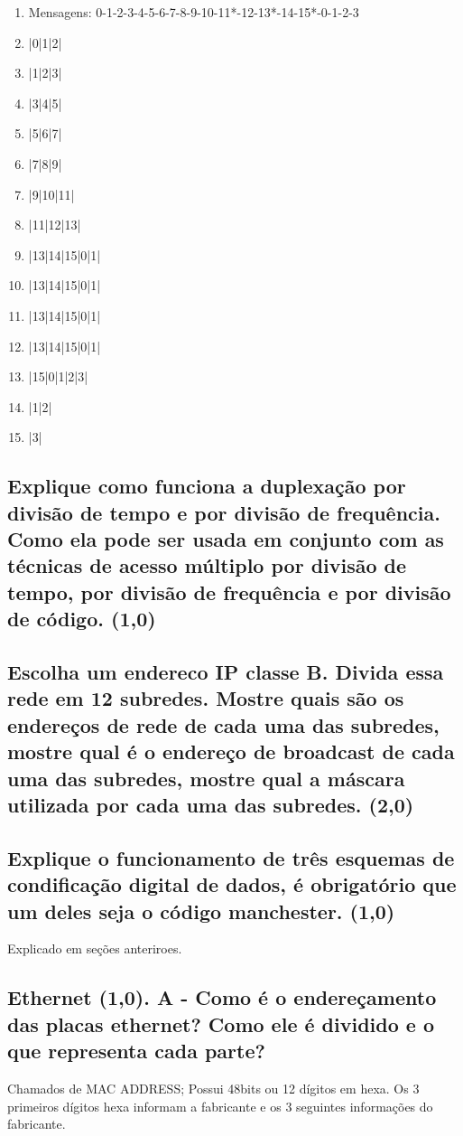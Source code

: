 \documentclass{article}
\begin{document}
\begin{enumerate}
	\item Mensagens: 0-1-2-3-4-5-6-7-8-9-10-11*-12-13*-14-15*-0-1-2-3
	\item |0|1|2|
	\item |1|2|3|
	\item |3|4|5|
	\item |5|6|7|
	\item |7|8|9|
	\item |9|10|11|
	\item |11|12|13|
	\item |13|14|15|0|1|
	\item |13|14|15|0|1|
	\item |13|14|15|0|1|
	\item |13|14|15|0|1|
	\item |15|0|1|2|3|
	\item |1|2|
	\item |3|
\end{enumerate}

\subsection{Explique como funciona a duplexação por divisão de tempo e por divisão de
frequência. Como ela pode ser usada em conjunto com as técnicas de acesso
múltiplo por divisão de tempo, por divisão de frequência e por divisão de
código. (1,0)}

\subsection{Escolha um endereco IP classe B. Divida essa rede em 12 subredes. Mostre
quais são os endereços de rede de cada uma das subredes, mostre qual é o
endereço de broadcast de cada uma das subredes, mostre qual a máscara utilizada
por cada uma das subredes. (2,0)}

\subsection{Explique o funcionamento de  três esquemas de condificação digital de dados,
é obrigatório que um deles seja o código manchester. (1,0)}
Explicado em seções anteriroes.

\subsection{Ethernet (1,0). A - Como é o endereçamento das placas ethernet? Como ele é dividido e o que
representa cada parte?}
Chamados de MAC ADDRESS; Possui 48bits ou 12 dígitos em hexa. Os 3 primeiros
dígitos hexa informam a fabricante e os 3 seguintes informações do fabricante.
\end{document}
